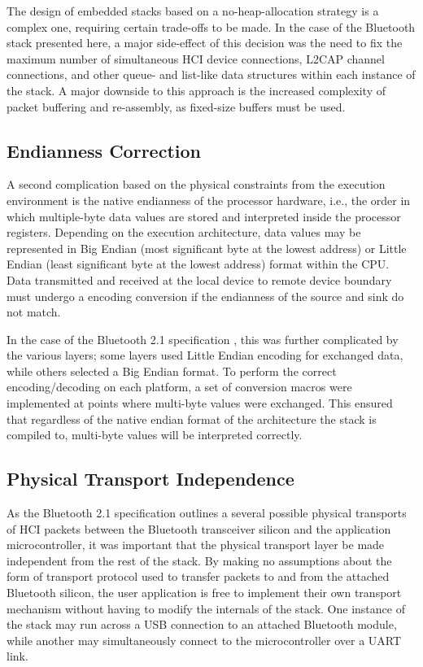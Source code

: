 The design of embedded stacks based on a no-heap-allocation strategy is a complex one, requiring certain trade-offs to be made. In the case of the Bluetooth stack presented here, a major side-effect of this decision was the need to fix the maximum number of simultaneous HCI device connections, L2CAP channel connections, and other queue- and list-like data structures within each instance of the stack. A major downside to this approach is the increased complexity of packet buffering and re-assembly, as fixed-size buffers must be used.

\subsection{Endianness Correction}

A second complication based on the physical constraints from the execution environment is the native endianness of the processor hardware, i.e., the order in which multiple-byte data values are stored and interpreted inside the processor registers. Depending on the execution architecture, data values may be represented in Big Endian (most significant byte at the lowest address) or Little Endian (least significant byte at the lowest address) format within the CPU. Data transmitted and received at the local device to remote device boundary must undergo a encoding conversion if the endianness of the source and sink do not match.

In the case of the Bluetooth 2.1 specification \cite{bt2p1specs}, this was further complicated by the various layers; some layers used Little Endian encoding for exchanged data, while others selected a Big Endian format. To perform the correct encoding/decoding on each platform, a set of conversion macros were implemented at points where multi-byte values were exchanged. This ensured that regardless of the native endian format of the architecture the stack is compiled to, multi-byte values will be interpreted correctly.

\subsection{Physical Transport Independence}

As the Bluetooth 2.1 specification outlines a several possible physical transports \cite{bt2p1specs_transports} of HCI packets between the Bluetooth transceiver silicon and the application microcontroller, it was important that the physical transport layer be made independent from the rest of the stack. By making no assumptions about the form of transport protocol used to transfer packets to and from the attached Bluetooth silicon, the user application is free to implement their own transport mechanism without having to modify the internals of the stack. One instance of the stack may run across a USB connection to an attached Bluetooth module, while another may simultaneously connect to the microcontroller over a UART link.

